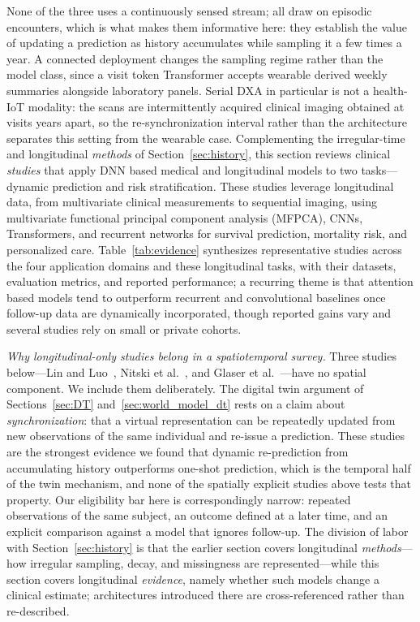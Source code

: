 \documentclass[journal]{IEEEtran}
\begin{document}
None of the three uses a continuously sensed stream; all draw on episodic encounters, which is what makes them informative here: they establish the value of updating a prediction as history accumulates while sampling it a few times a year. A connected deployment changes the sampling regime rather than the model class, since a visit token Transformer accepts wearable derived weekly summaries alongside laboratory panels. Serial DXA in particular is not a health-IoT modality: the scans are intermittently acquired clinical imaging obtained at visits years apart, so the re-synchronization interval rather than the architecture separates this setting from the wearable case.
\else
Complementing the irregular-time and longitudinal \emph{methods} of Section~\ref{sec:history}, this section reviews clinical \emph{studies} that apply DNN based medical and longitudinal models to two tasks---dynamic prediction and risk stratification. These studies leverage longitudinal data, from multivariate clinical measurements to sequential imaging, using multivariate functional principal component analysis (MFPCA), CNNs, Transformers, and recurrent networks for survival prediction, mortality risk, and personalized care. Table~\ref{tab:evidence} synthesizes representative studies across the four application domains and these longitudinal tasks, with their datasets, evaluation metrics, and reported performance; a recurring theme is that attention based models tend to outperform recurrent and convolutional baselines once follow-up data are dynamically incorporated, though reported gains vary and several studies rely on small or private cohorts.

\emph{Why longitudinal-only studies belong in a spatiotemporal survey.} Three studies below---Lin and Luo~\cite{lin2022deep}, Nitski et al.~\cite{nitski2021long}, and Glaser et al.~\cite{glaser2022deep}---have no spatial component. We include them deliberately. The digital twin argument of Sections~\ref{sec:DT} and~\ref{sec:world_model_dt} rests on a claim about \emph{synchronization}: that a virtual representation can be repeatedly updated from new observations of the same individual and re-issue a prediction. These studies are the strongest evidence we found that dynamic re-prediction from accumulating history outperforms one-shot prediction, which is the temporal half of the twin mechanism, and none of the spatially explicit studies above tests that property. Our eligibility bar here is correspondingly narrow: repeated observations of the same subject, an outcome defined at a later time, and an explicit comparison against a model that ignores follow-up. The division of labor with Section~\ref{sec:history} is that the earlier section covers longitudinal \emph{methods}---how irregular sampling, decay, and missingness are represented---while this section covers longitudinal \emph{evidence}, namely whether such models change a clinical estimate; architectures introduced there are cross-referenced rather than re-described.
\end{document}
